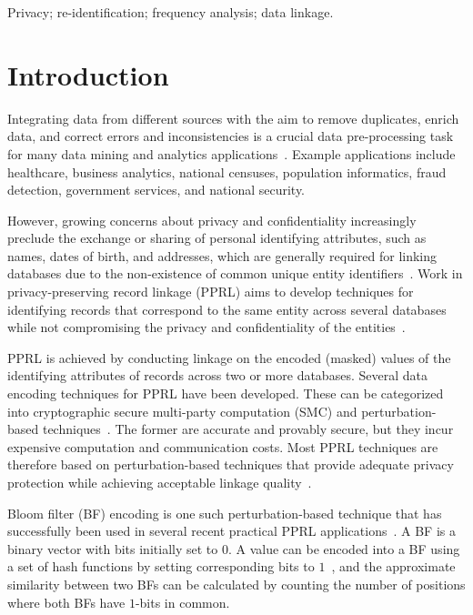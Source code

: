 \documentclass{llncs}
\begin{document}
\keywords Privacy; re-identification; frequency analysis; data
          linkage.


\section{Introduction}
\label{sec-intro}

Integrating data from different sources with the aim to remove
duplicates, enrich data, and correct errors and inconsistencies is a
crucial data pre-processing task for many data mining and analytics
applications~\cite{Chr12}. Example applications include healthcare,
business analytics, national censuses, population informatics, fraud
detection, government services, and national security.

However, growing concerns about privacy and confidentiality
increasingly preclude the exchange or sharing of personal identifying
attributes, such as names, dates of birth, and addresses, which are
generally required for linking databases due to the non-existence of
common unique entity identifiers~\cite{Chr12,Vat13}. Work in
privacy-preserving record linkage (PPRL) aims to develop techniques
for identifying records that correspond to the same entity across
several databases while not compromising the privacy and
confidentiality of the entities~\cite{Vat13}.

PPRL is achieved by conducting linkage on the encoded (masked) values
of the identifying attributes of records across two or more databases.
%
Several data encoding techniques for PPRL have been developed. These
can be categorized into cryptographic secure multi-party computation
(SMC) and perturbation-based techniques~\cite{Vat13}. The former are
accurate and provably secure, but they incur expensive computation
and communication costs.
Most PPRL techniques are therefore based on perturbation-based
techniques that provide adequate privacy protection while achieving
acceptable linkage quality~\cite{Ran16,Vat13}.

Bloom filter (BF) encoding is one such perturbation-based technique
that has successfully been used in several recent practical PPRL
applications~\cite{Boy15,Ran14}. A BF is a binary vector with bits
initially set to $0$. 
A value can be encoded into a BF using a set of hash functions by
setting corresponding bits to $1$~\cite{Sch09}, and the approximate
similarity between two BFs can be calculated by counting the number
of positions where both BFs have $1$-bits in common.
\end{document}
